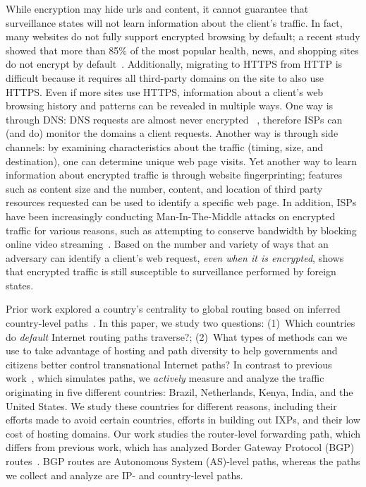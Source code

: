 While encryption may hide urls and content, it cannot guarantee that surveillance 
states will not learn information about the client's traffic.  In fact, many websites do not fully support 
encrypted browsing by default; a recent study showed that more than 85\% of the most popular 
health, news, and shopping sites do not encrypt by default~\cite{what_isps_can_see}.  Additionally, migrating 
to HTTPS from HTTP is difficult because it requires all third-party domains on the site to also use 
HTTPS.  Even if more sites use HTTPS, information about a client's web browsing history and patterns 
can be revealed in multiple ways. One way is through DNS: DNS requests are almost never encrypted ~\cite{what_isps_can_see}, therefore 
ISPs can (and do) monitor the domains a client requests.  Another way is through side channels: by examining 
characteristics about the traffic (timing, size, and destination), one can determine unique web page visits.  
Yet another way to learn information about encrypted traffic is through website fingerprinting; features 
such as content size and the number, content, and location of third party resources requested can be used to 
identify a specific web page.  In addition, ISPs have been increasingly conducting Man-In-The-Middle attacks on 
encrypted traffic for various reasons, such as attempting to conserve bandwidth by blocking online video streaming~\cite{mitm_isp}.  
Based on the number and variety of ways that an adversary can identify a client's web request, \textit{even when it is encrypted}, 
shows that encrypted traffic is still susceptible to surveillance performed by foreign states.

Prior work explored a country's centrality to global routing based on 
inferred country-level paths~\cite{karlin2009nation}. 
In this paper, we study two questions: (1)~Which countries do {\em
  default} Internet routing paths traverse?; (2)~What types of methods
can we use to take advantage of hosting and path diversity to help governments
and citizens better control transnational Internet paths? 
In contrast to previous work~\cite{karlin2009nation}, which simulates paths, we \textit{actively} measure and analyze the traffic originating in
five different countries: Brazil, Netherlands, Kenya, India, and the
United States.  We study these countries for different reasons, including their efforts made to avoid certain countries, efforts in building out IXPs, and their low cost of hosting domains.  Our work studies the router-level forwarding path, which differs from 
 previous work, which has analyzed Border Gateway Protocol (BGP) routes~\cite{karlin2009nation,shah2015characterizing}.  
BGP routes are Autonomous System (AS)-level paths, whereas the paths we collect and analyze are IP- and country-level paths.  

